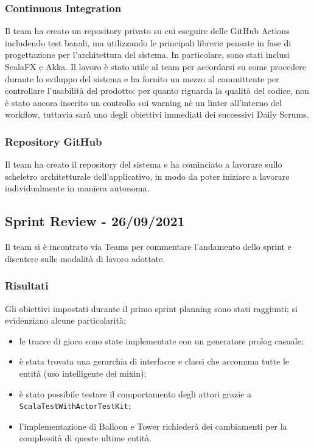 \subsubsection{Continuous Integration}
Il team ha creato un repository privato su cui eseguire delle GitHub Actions includendo test banali, ma utilizzando le
principali librerie pensate in fase di progettazione per l'architettura del sistema. In particolare, sono stati
inclusi ScalaFX e Akka. Il lavoro è stato utile al team per accordarsi su come procedere durante lo sviluppo del
sistema e ha fornito un mezzo al committente per controllare l'usabilità del prodotto: per quanto riguarda la qualità
del codice, non è stato ancora inserito un controllo sui warning nè un linter all'interno del workflow, tuttavia sarà
uno degli obiettivi immediati dei successivi Daily Scrums.

\subsubsection{Repository GitHub}
Il team ha creato il repository del sistema e ha cominciato a lavorare sullo scheletro architetturale dell'applicativo,
in modo da poter iniziare a lavorare individualmente in maniera autonoma.

\subsection{Sprint Review - 26/09/2021}
Il team si è incontrato via Teams per commentare l'andamento dello sprint e discutere sulle modalità di lavoro adottate.

\subsubsection{Risultati}
Gli obiettivi impostati durante il primo sprint planning sono stati raggiunti; si evidenziano alcune particolarità:
\begin{itemize}
    \item le tracce di gioco sono state implementate con un generatore prolog casuale;
    \item è stata trovata una gerarchia di interfacce e classi che accomuna tutte le entità (uso intelligente dei mixin);
    \item è stato possibile testare il comportamento degli attori grazie a \texttt{ScalaTestWithActorTestKit};
    \item l'implementazione di Balloon e Tower richiederà dei cambiamenti per la complessità di queste ultime entità.
\end{itemize}


